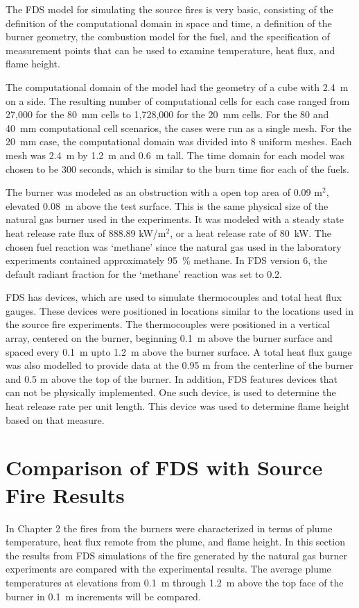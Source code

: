 \documentclass[twoside]{uocthesis}
\begin{document}
{The FDS model for simulating the source fires is very basic, consisting of the definition of the computational domain in space and time, a definition of the burner geometry, the combustion model for the fuel, and the specification of measurement points that can be used to examine temperature, heat flux, and flame height.

The computational domain of the model had the geometry of a cube with 2.4~m on a side.  The resulting number of computational cells for each case ranged from 27,000 for the 80~mm cells to 1,728,000 for the 20~mm cells. For the 80 and 40~mm computational cell scenarios, the cases were run as a single mesh.  For the 20~mm case, the computational domain was divided into 8 uniform meshes.  Each mesh was 2.4~m by 1.2~m and 0.6~m tall.  The time domain for each model was chosen to be 300 seconds, which is similar to the burn time fior each of the fuels.    

The burner was modeled as an obstruction with a open top area of 0.09 m$^2$, elevated 0.08~m above the test surface.  This is the same physical size of the natural gas burner used in the experiments.  It was modeled with a steady state heat release rate flux of 888.89 kW/m$^2$, or a heat release rate of 80~kW.   The chosen fuel reaction was `methane' since the natural gas used in the laboratory experiments contained approximately 95~\% methane.  In FDS version 6, the default radiant fraction for the `methane' reaction was set to 0.2.  

FDS has devices, which are used to simulate thermocouples and total heat flux gauges.  These devices were positioned in locations similar to the locations used in the source fire experiments.  The thermocouples were positioned in a vertical array, centered on the burner, beginning 0.1~m above the burner surface and spaced every 0.1~m upto 1.2~m above the burner surface.  A total heat flux gauge was also modelled to provide data at the 0.95 m from the centerline of the burner and 0.5 m above the top of the burner.  
In addition, FDS features devices that can not be physically implemented.  One such device, is used to determine the heat release rate per unit length.  This device was used to determine flame height based on that measure. 

\section{Comparison of FDS with Source Fire Results}

In Chapter 2 the fires from the burners were characterized in terms of plume temperature, heat flux remote from the plume, and flame height.  In this section the results from FDS simulations of the fire generated by the natural gas burner experiments are compared with the experimental results.  The average plume temperatures at elevations from 0.1~m through 1.2~m above the top face of the burner in 0.1~m increments will be compared.   

}
\end{document}

